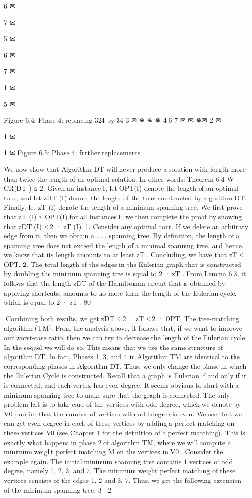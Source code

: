 \documentclass[titlepage]{book}
\theoremstyle{plain}
\theoremstyle{definition}
\theoremstyle{remark}
\begin{document}
6
✉

7
✉

5
✉

6
✉

7
✉

1 ✉

5
✉

Figure 6.4: Phase 4: replacing 324 by 34
3 ✉
❅
❅
❅ 4
6
7
✉
✉
❅✉
2 ✉

1 ✉

1 ✉
Figure 6.5: Phase 4: further replacements

We now show that Algorithm DT will never produce a solution with length more than twice the length
of an optimal solution. In other words:
Theorem 6.4 W CR(DT ) ≤ 2.
Given an instance I, let OPT(I) denote the length of an optimal tour, and let zDT (I) denote the length
of the tour constructed by algorithm DT. Finally, let zT (I) denote the length of a minimum spanning
tree. We first prove that zT (I) ≤ OPT(I) for all instances I; we then complete the proof by showing
that zDT (I) ≤ 2 · zT (I).
1. Consider any optimal tour. If we delete an arbitrary edge from it, then we obtain a . . . spanning tree.
By definition, the length of a spanning tree does not exceed the length of a minimal spanning tree,
and hence, we know that its length amounts to at least zT . Concluding, we have that zT ≤ OPT.
2. The total length of the edges in the Eulerian graph that is constructed by doubling the minimum
spanning tree is equal to 2 · zT . From Lemma 6.3, it follows that the length zDT of the Hamiltonian
circuit that is obtained by applying shortcuts, amounts to no more than the length of the Eulerian
cycle, which is equal to 2 · zT .
80

Combining both results, we get zDT ≤ 2 · zT ≤ 2 · OPT.
The tree-matching algorithm (TM).
From the analysis above, it follows that, if we want to improve our worst-case ratio, then we can try to
decrease the length of the Eulerian cycle. In the sequel we will do so. This means that we use the same
structure of algorithm DT. In fact, Phases 1, 3, and 4 in Algorithm TM are identical to the corresponding
phases in Algorithm DT. Thus, we only change the phase in which the Eulerian Cycle is constructed.
Recall that a graph is Eulerian if and only if it is connected, and each vertex has even degree. It seems
obvious to start with a minimum spanning tree to make sure that the graph is connected. The only
problem left is to take care of the vertices with odd degree, which we denote by V0 ; notice that the
number of vertices with odd degree is even. We see that we can get even degree in each of these vertices
by adding a perfect matching on these vertices V0 (see Chapter 1 for the definition of a perfect matching).
This is exactly what happens in phase 2 of algorithm TM, where we will compute a minimum weight
perfect matching M on the vertices in V0 .
Consider the example again. The initial minimum spanning tree contains 4 vertices of odd degree, namely
1, 2, 3, and 7. The minimum weight perfect matching of these vertices consists of the edges {1, 2} and
{3, 7}. Thus, we get the following extension of the minimum spanning tree.
3 ✉
2 ✉
\end{document}
